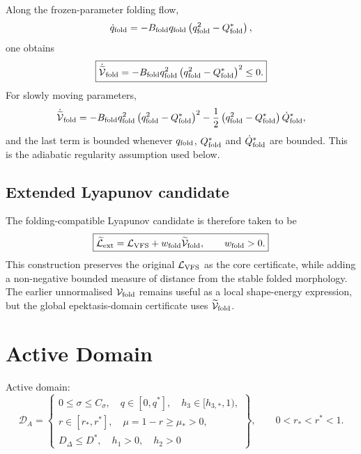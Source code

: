 \documentclass[11pt,a4paper]{article}
\newcommand{\DA}{\mathcal D_A}
\newcommand{\LV}{\mathcal L_{\rm VFS}}
\theoremstyle{plain}
\theoremstyle{definition}
\theoremstyle{remark}
\begin{document}
Along the frozen-parameter folding flow,
\begin{equation}
  \dot q_{\rm fold}
  =-B_{\rm fold}q_{\rm fold}\left(q_{\rm fold}^{2}-Q_{\rm fold}^{*}\right),
\end{equation}
one obtains
\begin{equation}
  \boxed{
  \dot{\widetilde{\mathcal V}}_{\rm fold}
  =-B_{\rm fold}q_{\rm fold}^{2}
  \left(q_{\rm fold}^{2}-Q_{\rm fold}^{*}\right)^2\le0.}
\end{equation}
For slowly moving parameters,
\begin{equation}
  \dot{\widetilde{\mathcal V}}_{\rm fold}
  =-B_{\rm fold}q_{\rm fold}^{2}
  \left(q_{\rm fold}^{2}-Q_{\rm fold}^{*}\right)^2
  -\frac12\left(q_{\rm fold}^{2}-Q_{\rm fold}^{*}\right)
  \dot Q_{\rm fold}^{*},
\end{equation}
and the last term is bounded whenever $q_{\rm fold}$, $Q_{\rm fold}^{*}$ and
$\dot Q_{\rm fold}^{*}$ are bounded. This is the adiabatic regularity assumption
used below.

\subsection{Extended Lyapunov candidate}
The folding-compatible Lyapunov candidate is therefore taken to be
\begin{equation}
  \boxed{
  \widetilde{\mathcal L}_{\rm ext}
  =\LV+w_{\rm fold}\widetilde{\mathcal V}_{\rm fold},
  \qquad
  w_{\rm fold}>0.}
\end{equation}
This construction preserves the original $\LV$ as the core certificate, while
adding a non-negative bounded measure of distance from the stable folded
morphology. The earlier unnormalised $\mathcal V_{\rm fold}$ remains useful as a
local shape-energy expression, but the global epektasis-domain certificate uses
$\widetilde{\mathcal V}_{\rm fold}$.


\section{Active Domain}

Active domain:
\begin{equation}
\DA=\left\{
\begin{array}{l}
0\le\sigma\le C_\sigma,\quad q\in[0,q^*],\quad h_3\in[h_{3,*},1),\\
r\in[r_*,r^*],\quad \mu=1-r\ge\mu_*>0,\\
D_\Delta\le D^*,\quad h_1>0,\quad h_2>0
\end{array}
\right\},
\qquad
0<r_*<r^*<1.
\end{equation}
\end{document}

